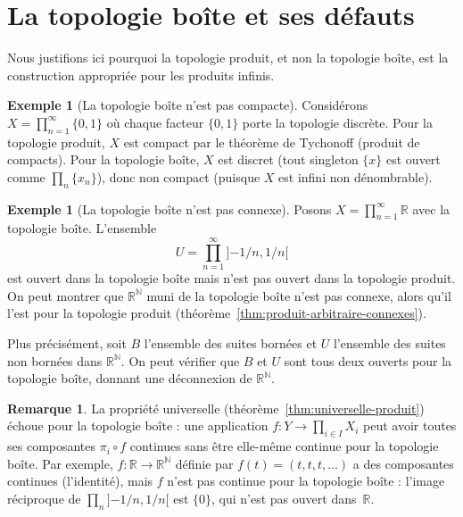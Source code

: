 \documentclass[12pt,a4paper,openany]{book}
\theoremstyle{definition}
\theoremstyle{cours}
\theoremstyle{coursnormal}
\newtheorem{remarque}[theoreme]{Remarque}
\newtheorem{exemple}[theoreme]{Exemple}
\begin{document}
\section{La topologie boîte et ses défauts}
\label{sec:boite-problemes}

Nous justifions ici pourquoi la topologie produit, et non la topologie boîte, est
la construction appropriée pour les produits infinis.

\begin{exemple}[La topologie boîte n'est pas compacte]
\label{ex:boite-non-compacte}
Considérons $X = \prod_{n=1}^{\infty} \{0,1\}$ où chaque facteur $\{0,1\}$ porte
la topologie discrète. Pour la topologie produit, $X$ est compact par le
théorème de Tychonoff (produit de compacts). Pour la
topologie boîte, $X$ est discret (tout singleton $\{x\}$ est ouvert comme
$\prod_{n} \{x_n\}$), donc non compact (puisque $X$ est infini non dénombrable).
\end{exemple}

\begin{exemple}[La topologie boîte n'est pas connexe]
\label{ex:boite-non-connexe}
Posons $X = \prod_{n=1}^{\infty} \mathbb{R}$ avec la topologie boîte. L'ensemble
\[
U = \prod_{n=1}^{\infty} {]{-1/n}, 1/n[}
\]
est ouvert dans la topologie boîte mais n'est pas ouvert dans la topologie produit.
On peut montrer que $\mathbb{R}^{\mathbb{N}}$ muni de la topologie boîte n'est pas
connexe, alors qu'il l'est pour la topologie produit
(théorème~\ref{thm:produit-arbitraire-connexes}).

Plus précisément, soit $B$ l'ensemble des suites bornées et $U$ l'ensemble des
suites non bornées dans $\mathbb{R}^{\mathbb{N}}$. On peut vérifier que $B$ et $U$
sont tous deux ouverts pour la topologie boîte, donnant une déconnexion de
$\mathbb{R}^{\mathbb{N}}$.
\end{exemple}

\begin{remarque}
\label{rem:boite-continuite}
La propriété universelle (théorème~\ref{thm:universelle-produit}) échoue pour la
topologie boîte : une application $f \colon Y \to \prod_{i \in I} X_i$ peut avoir
toutes ses composantes $\pi_i \circ f$ continues sans être elle-même continue pour
la topologie boîte. Par exemple, $f \colon \mathbb{R} \to \mathbb{R}^{\mathbb{N}}$
définie par $f(t) = (t, t, t, \ldots)$ a des composantes continues (l'identité),
mais $f$ n'est pas continue pour la topologie boîte : l'image réciproque de
$\prod_{n} {]{-1/n}, 1/n[}$ est $\{0\}$, qui n'est pas ouvert dans~$\mathbb{R}$.
\end{remarque}
\end{document}

